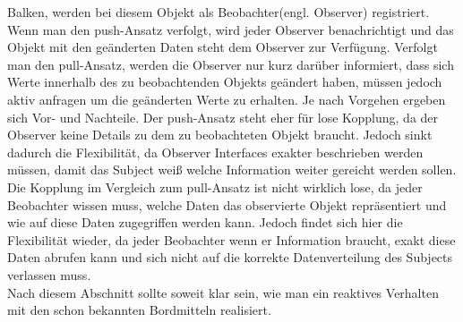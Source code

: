 Balken, werden bei diesem Objekt als Beobachter(engl. Observer) registriert. Wenn man den push-Ansatz verfolgt, wird jeder Observer benachrichtigt und das Objekt mit den geänderten Daten steht dem Observer zur Verfügung. Verfolgt man den pull-Ansatz, werden die Observer nur kurz darüber informiert, dass sich Werte innerhalb des zu beobachtenden Objekts geändert haben, müssen jedoch aktiv anfragen um die geänderten Werte zu erhalten. Je nach Vorgehen ergeben sich Vor- und Nachteile. Der push-Ansatz steht eher für lose Kopplung, da der Observer keine Details zu dem zu beobachteten Objekt braucht. Jedoch sinkt dadurch die Flexibilität, da Observer Interfaces exakter beschrieben werden müssen, damit das Subject weiß welche Information weiter gereicht werden sollen. Die Kopplung im Vergleich zum pull-Ansatz ist nicht wirklich lose, da jeder Beobachter wissen muss, welche Daten das observierte Objekt repräsentiert und wie auf diese Daten zugegriffen werden kann. Jedoch findet sich hier die Flexibilität wieder, da jeder Beobachter wenn er Information braucht, exakt diese Daten abrufen kann und sich nicht auf die korrekte Datenverteilung des Subjects verlassen muss. \\ Nach diesem Abschnitt sollte soweit klar sein, wie man ein reaktives Verhalten mit den schon bekannten Bordmitteln realisiert.
